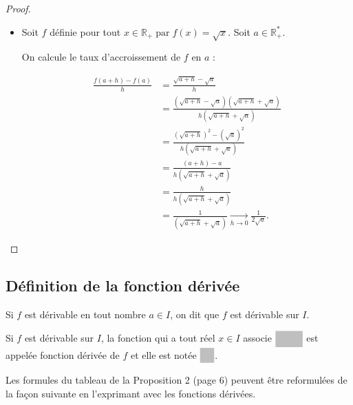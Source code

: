 \documentclass[12pt]{article}
\theoremstyle{break}
\begin{document}
\begin{proof}
\begin{itemize}
Ainsi, $f$ est dérivable en $a$ et $f^{\prime}(a)=-\dfrac{1}{a^{2}}$.

  \item Soit $f$ définie pour tout $x \in \mathbb{R}_{+} \operatorname{par} f(x)=\sqrt{x}$. Soit $a \in \mathbb{R}_{+}^{*}$.

On calcule le taux d'accroissement de $f$ en $a$ :

$$
\begin{aligned}
\frac{f(a+h)-f(a)}{h} & =\frac{\sqrt{a+h}-\sqrt{a}}{h} \\
& =\frac{(\sqrt{a+h}-\sqrt{a})(\sqrt{a+h}+\sqrt{a})}{h(\sqrt{a+h}+\sqrt{a})} \\
& =\frac{(\sqrt{a+h})^{2}-(\sqrt{a})^{2}}{h(\sqrt{a+h}+\sqrt{a})} \\
& =\frac{(a+h)-a}{h(\sqrt{a+h}+\sqrt{a})} \\
& =\frac{h}{h(\sqrt{a+h}+\sqrt{a})} \\
& =\frac{1}{(\sqrt{a+h}+\sqrt{a})}\underset{h \rightarrow 0}{\longrightarrow} \frac{1}{2 \sqrt{a}}.
\end{aligned}
$$
\end{itemize}
\end{proof}

\subsection{Définition de la fonction dérivée}
\begin{definition}{}{}
Si $f$ est dérivable en tout nombre $a \in I$, on dit que $f$ est dérivable sur $I$.
\end{definition}

\begin{definition}{}{}
Si $f$ est dérivable sur $I$, la fonction qui a tout réel $x \in I$ associe $\hideM{f^{\prime}(x)}$ est appelée fonction dérivée de $f$ et elle est notée $\hideM{f^{\prime}}$.
\end{definition}

Les formules du tableau de la Proposition 2 (page 6) peuvent être reformulées de la façon suivante en l'exprimant avec les fonctions dérivées.
\end{document}
